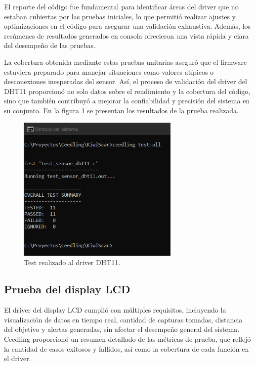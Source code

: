 El reporte del código fue fundamental para identificar áreas del driver que no estaban cubiertas por las pruebas iniciales, lo que permitió realizar ajustes y optimizaciones en el código para asegurar una validación exhaustiva. Además, los resúmenes de resultados generados en consola ofrecieron una vista rápida y clara del desempeño de las pruebas.

\newpage

La cobertura obtenida mediante estas pruebas unitarias aseguró que el firmware estuviera preparado para manejar situaciones como valores atípicos o desconexiones inesperadas del sensor. Así, el proceso de validación del driver del DHT11 proporcionó no solo datos sobre el rendimiento y la cobertura del código, sino que también contribuyó a mejorar la confiabilidad y precisión del sistema en su conjunto. En la figura \ref{fig:test_sensor_dht11} se presentan los resultados de la prueba realizada.

\vspace{1cm}

\begin{figure}[htbp]
	\centering
	\includegraphics[width=0.7\textwidth, height=0.3\textheight]{./Figures/test_sensor_dht11.png}
	\caption{Test realizado al driver DHT11.}
	\label{fig:test_sensor_dht11}
\end{figure}

\vspace{1cm}

\subsection{Prueba del display LCD}

El driver del display LCD cumplió con múltiples requisitos, incluyendo la visualización de datos en tiempo real, cantidad de capturas tomadas, distancia del objetivo y alertas generadas, sin afectar el desempeño general del sistema. Ceedling proporcionó un resumen detallado de las métricas de prueba, que reflejó la cantidad de casos exitosos y fallidos, así como la cobertura de cada función en el driver.

